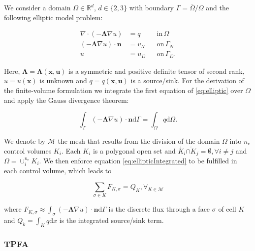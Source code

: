 We consider a domain $\Omega \in \mathbb{R}^d$, $d \in \{ 2, 3 \}$ with boundary $\Gamma = \bar{\Omega} / \Omega$ and the following elliptic model problem:

\begin{equation}
  \begin{aligned}
                   \nabla \cdot \left( - \mathbf{\Lambda} \nabla u \right) &= q   &&\mathrm{in} \, \Omega \\
               \left( - \mathbf{\Lambda} \nabla u \right) \cdot \mathbf{n} &= v_N &&\mathrm{on} \, \Gamma_N \\
                                                                   u &= u_D &&\mathrm{on} \, \Gamma_D.
    \label{eq:elliptic}
  \end{aligned}
\end{equation}

Here, $\mathbf{\Lambda} = \mathbf{\Lambda}(\mathbf{x}, \mathbf{u})$ is a symmetric and positive definite tensor of second rank, $u = u (\mathbf{x})$ is unknown and $q = q(\mathbf{x}, \mathbf{u})$ is a source/sink. For the derivation of the finite-volume formulation we integrate the first equation of \eqref{eq:elliptic} over $\Omega$ and apply the Gauss divergence theorem:

\begin{equation}
    \int_{\Gamma} \left( - \mathbf{\Lambda} \nabla u \right) \cdot \mathbf{n} \mathrm{d} \Gamma = \int_\Omega q \mathrm{d}\Omega.
    \label{eq:ellipticIntegrated}
\end{equation}

We denote by $\mathcal{M}$ the mesh that results from the division of the domain $\Omega$ into $n_e$ control volumes $K_i$. Each $K_i$ is a polygonal open set and $\mathring{K_i} \mathring{\cap K_j} = \emptyset, \forall{i \neq j}$ and $\Omega = \cup_i^{n_e} K_i$. We then enforce equation \eqref{eq:ellipticIntegrated} to be fulfilled in each control volume, which leads to

\begin{equation}
    \sum_{\sigma \in K} F_{K, \sigma} = Q_K, \forall_{K \in \mathcal{M}}
\end{equation}

where $F_{K, \sigma} \approx \int_{\sigma} \left( - \mathbf{\Lambda} \nabla u \right) \cdot \mathbf{n} \mathrm{d} \Gamma$ is the discrete flux through a face $\sigma$ of cell $K$ and $Q_k = \int_K q \mathrm{d}x$ is the integrated source/sink term. 

\subsubsection{TPFA}\label{cc_tpfa}

